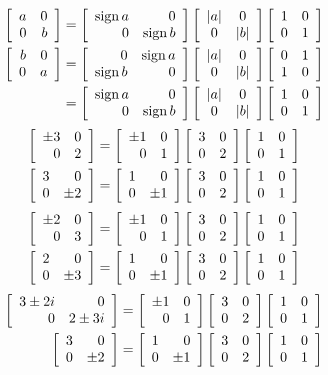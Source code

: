 \begin{equation}
  \begin{split}
    \mat{rr}{a&0\\0&b}&=\mat{rr}{\sgn a&0\\0&\sgn b}\mat{cc}{\abs{a}&0\\0&\abs{b}}\mat{cc}{1&0\\0&1}\\
    \mat{rr}{b&0\\0&a}
    &=\mat{rr}{0&\sgn a\\\sgn b&0}\mat{cc}{\abs{a}&0\\0&\abs{b}}\mat{cc}{0&1\\1&0}\\
    &=\mat{rr}{\sgn a&0\\0&\sgn b}\mat{cc}{\abs{a}&0\\0&\abs{b}}\itwo
  \end{split}
\end{equation}
\begin{equation}
  \begin{split}
    \mat{rr}{\pm3&0\\0&2}&=\mat{rr}{\pm1&0\\0&1}\mat{cc}{3&0\\0&2}\mat{cc}{1&0\\0&1}\\
    \mat{rr}{3&0\\0&\pm2}&=\mat{rr}{1&0\\0&\pm1}\mat{cc}{3&0\\0&2}\mat{cc}{1&0\\0&1}
  \end{split}
\end{equation}
\begin{equation}
  \begin{split}
    \mat{rr}{\pm2&0\\0&3}&=\mat{rr}{\pm1&0\\0&1}\mat{cc}{3&0\\0&2}\mat{cc}{1&0\\0&1}\\
    \mat{rr}{2&0\\0&\pm3}&=\mat{rr}{1&0\\0&\pm1}\mat{cc}{3&0\\0&2}\mat{cc}{1&0\\0&1}
  \end{split}
\end{equation}
\begin{equation}
  \begin{split}
    \mat{rr}{3\pm2i&0\\0&2\pm3i}&=\mat{rr}{\pm1&0\\0&1}\mat{cc}{3&0\\0&2}\mat{cc}{1&0\\0&1}\\
    \mat{rr}{3&0\\0&\pm2}&=\mat{rr}{1&0\\0&\pm1}\mat{cc}{3&0\\0&2}\mat{cc}{1&0\\0&1}
  \end{split}
\end{equation}

